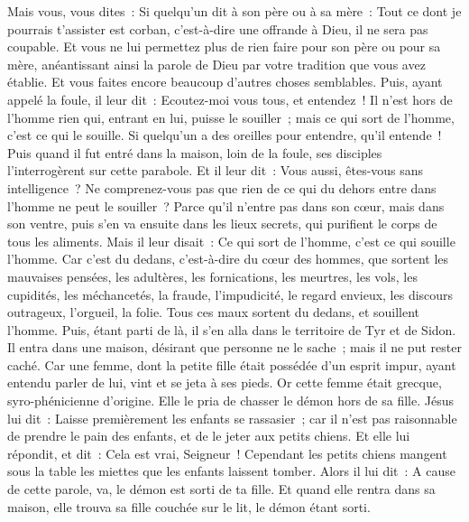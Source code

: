 \begin{multicols}{2}
Mais vous, vous dites~: Si quelqu'un dit à son père ou à sa mère~: Tout ce dont je pourrais t'assister est corban, c'est-à-dire une offrande à Dieu, il ne sera pas coupable.
Et vous ne lui permettez plus de rien faire pour son père ou pour sa mère,
anéantissant ainsi la parole de Dieu par votre tradition que vous avez établie. Et vous faites encore beaucoup d'autres choses semblables.
Puis, ayant appelé la foule, il leur dit~: Ecoutez-moi vous tous, et entendez~!
Il n'est hors de l'homme rien qui, entrant en lui, puisse le souiller~; mais ce qui sort de l'homme, c'est ce qui le souille.
Si quelqu'un a des oreilles pour entendre, qu'il entende~!
Puis quand il fut entré dans la maison, loin de la foule, ses disciples l'interrogèrent sur cette parabole.
Et il leur dit~: Vous aussi, êtes-vous sans intelligence~? Ne comprenez-vous pas que rien de ce qui du dehors entre dans l'homme ne peut le souiller~?
Parce qu'il n'entre pas dans son cœur, mais dans son ventre, puis s'en va ensuite dans les lieux secrets, qui purifient le corps de tous les aliments.
Mais il leur disait~: Ce qui sort de l'homme, c'est ce qui souille l'homme.
Car c'est du dedans, c'est-à-dire du cœur des hommes, que sortent les mauvaises pensées, les adultères, les fornications, les meurtres,
les vols, les cupidités, les méchancetés, la fraude, l'impudicité, le regard envieux, les discours outrageux, l'orgueil, la folie.
Tous ces maux sortent du dedans, et souillent l'homme.
Puis, étant parti de là, il s'en alla dans le territoire de Tyr et de Sidon. Il entra dans une maison, désirant que personne ne le sache~; mais il ne put rester caché.
Car une femme, dont la petite fille était possédée d'un esprit impur, ayant entendu parler de lui, vint et se jeta à ses pieds.
Or cette femme était grecque, syro-phénicienne d'origine. Elle le pria de chasser le démon hors de sa fille. Jésus lui dit~:
Laisse premièrement les enfants se rassasier~; car il n'est pas raisonnable de prendre le pain des enfants, et de le jeter aux petits chiens.
Et elle lui répondit, et dit~: Cela est vrai, Seigneur~! Cependant les petits chiens mangent sous la table les miettes que les enfants laissent tomber.
Alors il lui dit~: A cause de cette parole, va, le démon est sorti de ta fille.
Et quand elle rentra dans sa maison, elle trouva sa fille couchée sur le lit, le démon étant sorti.

\end{multicols}
